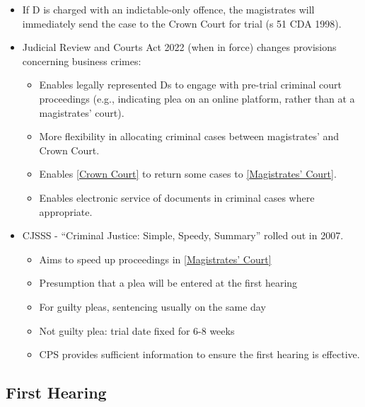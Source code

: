 \documentclass[
]{article}
\providecommand{\tightlist}{%
  \setlength{\itemsep}{0pt}\setlength{\parskip}{0pt}}
\begin{document}
\begin{itemize}
\tightlist
\item
  If D is charged with an indictable-only offence, the magistrates will
  immediately send the case to the Crown Court for trial (s 51 CDA
  1998).
\item
  Judicial Review and Courts Act 2022 (when in force) changes provisions
  concerning business crimes:

  \begin{itemize}
  \tightlist
  \item
    Enables legally represented Ds to engage with pre-trial criminal
    court proceedings (e.g., indicating plea on an online platform,
    rather than at a magistrates' court).
  \item
    More flexibility in allocating criminal cases between magistrates'
    and Crown Court.
  \item
    Enables \href{no\%20financial\%20limit.}{{[}Crown Court{]}} to
    return some cases to
    \href{maximum\%20compensation\%20of\%20£5,000\%20per\%20offence}{{[}Magistrates'
    Court{]}}.
  \item
    Enables electronic service of documents in criminal cases where
    appropriate.
  \end{itemize}
\item
  CJSSS - ``Criminal Justice: Simple, Speedy, Summary'' rolled out in
  2007.

  \begin{itemize}
  \tightlist
  \item
    Aims to speed up proceedings in
    \href{maximum\%20compensation\%20of\%20£5,000\%20per\%20offence}{{[}Magistrates'
    Court{]}}
  \item
    Presumption that a plea will be entered at the first hearing
  \item
    For guilty pleas, sentencing usually on the same day
  \item
    Not guilty plea: trial date fixed for 6-8 weeks
  \item
    CPS provides sufficient information to ensure the first hearing is
    effective.
  \end{itemize}
\end{itemize}

\hypertarget{first-hearing}{%
\subsection{First Hearing}\label{first-hearing}}
\end{document}
